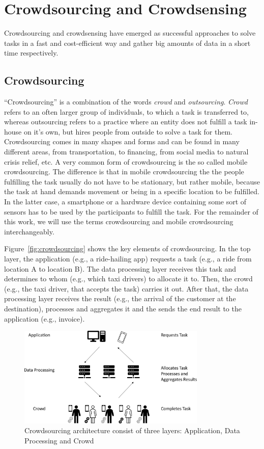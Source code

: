\section{Crowdsourcing and Crowdsensing}
\label{sec:crowdsourcing_crowdsensing_background}
Crowdsourcing and crowdsensing have emerged as successful approaches to solve tasks in a fast and cost-efficient way and gather big amounts of data in a short time respectively.

\subsection*{Crowdsourcing}
``Crowdsourcing'' is a combination of the words \textit{crowd} and \textit{outsourcing}.
\textit{Crowd} refers to an often larger group of individuals, to which a task is transferred to, whereas outsourcing refers to a practice where an entity does not fulfill a task in-house on it's own, but hires people from outside to solve a task for them.
Crowdsourcing comes in many shapes and forms and can be found in many different areas, from transportation, to financing, from social media to natural crisis relief, etc.
A very common form of crowdsourcing is the so called mobile crowdsourcing.
The difference is that in mobile crowdsourcing the the people fulfilling the task usually do not have to be stationary, but rather mobile, because the task at hand demands movement or being in a specific location to be fulfilled.
In the latter case, a smartphone or a hardware device containing some sort of sensors has to be used by the participants to fulfill the task.
For the remainder of this work, we will use the terms crowdsourcing and mobile crowdsourcing interchangeably.

Figure~\ref{fig:crowdsourcing} shows the key elements of crowdsourcing.
In the top layer, the application (e.g., a ride-hailing app) requests a task (e.g., a ride from location A to location B).
The data processing layer receives this task and determines to whom (e.g., which taxi drivers) to allocate it to.
Then, the crowd (e.g., the taxi driver, that accepts the task) carries it out.
After that, the data processing layer receives the result (e.g., the arrival of the customer at the destination), processes and aggregates it and the sends the end result to the application (e.g., invoice).

\begin{figure}[htbp]
  \centering
  \includegraphics[width=0.8\textwidth]{fig/crowdsourcing.pdf}
  \caption{Crowdsourcing architecture consist of three layers: Application, Data Processing and Crowd}
\end{figure}
\label{fig:crowdsourcing}

